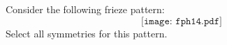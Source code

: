 \documentclass{ximera}
\author{Bart Snapp}
\begin{document}
\begin{exercise}
  Consider the following frieze pattern:
  \[
  \texttt{[image: fph14.pdf]}
  \]
  Select all symmetries for this pattern.
  \begin{selectAll}
  \end{selectAll}
\end{exercise}
\end{document}
